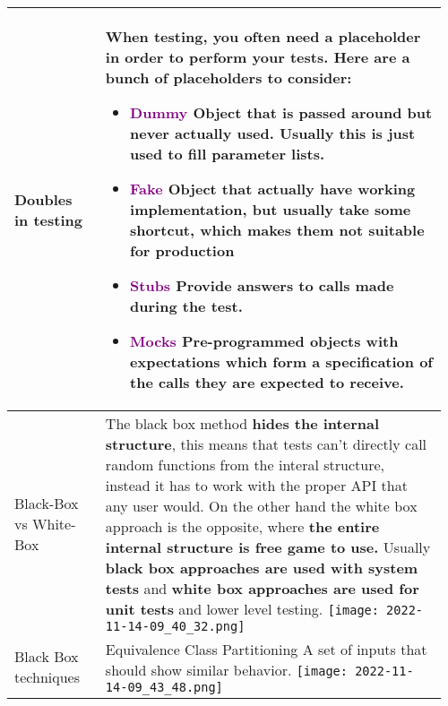 \documentclass[main.tex,fontsize=8pt,paper=a4,paper=portrait,DIV=calc,]{scrartcl}
\begin{document}
\begin{table}[ht!]
\begin{tabular}{|m{0.2\linewidth}|m{0.755\linewidth}|}
\hline
Doubles in testing & 
When testing, you often need a placeholder in order to perform your tests.\newline
Here are a bunch of placeholders to consider:\newline
\begin{itemize}
\item \textcolor{purple}{Dummy}\newline
  Object that is passed around but never actually used.\newline
  Usually this is just used to fill parameter lists.
\item \textcolor{purple}{Fake}\newline
  Object that actually have working implementation, but usually take some shortcut,\newline
  which makes them not suitable for production
\item \textcolor{purple}{Stubs}\newline
  Provide answers to calls made during the test.
\item \textcolor{purple}{Mocks}\newline
  Pre-programmed objects with expectations which form a specification of the calls they are expected to receive.
\vspace{-3mm}
\end{itemize} \\
\hline
Black-Box vs White-Box & 
The black box method \textbf{hides the internal structure}, this means that tests can't directly call random functions from the interal structure, instead it has to work with the proper API that any user would.\newline
On the other hand the white box approach is the opposite, where \textbf{the entire internal structure is free game to use.}\newline
Usually \textbf{black box approaches are used with system tests} and \textbf{white box approaches are used for unit tests} and lower level testing.\newline
\texttt{[image: 2022-11-14-09\_40\_32.png]}\\
\hline
Black Box techniques & 
\textcolor{OliveGreen}{Equivalence Class Partitioning}\newline
A set of inputs that should show similar behavior.\newline
\texttt{[image: 2022-11-14-09\_43\_48.png]}\newline

\end{tabular}
\end{table}
\end{document}
